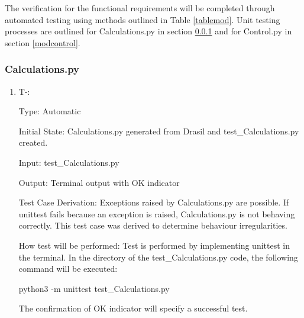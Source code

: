 \documentclass[12pt, titlepage]{article}
\newcounter{tinnum} %
\begin{document}
The verification for the functional requirements will be completed through 
automated testing using methods outlined in Table \ref{tablemod}. Unit testing 
processes are outlined for Calculations.py in section \ref{modcalc} and for 
Control.py in section \ref{modcontrol}.

\subsubsection{Calculations.py}\label{modcalc}

\begin{enumerate}

\item{T-}\thetinnum\label{T-15}:

Type: Automatic
					
Initial State: Calculations.py generated from Drasil and test\_Calculations.py 
created.
					
Input: test\_Calculations.py 
					
Output: Terminal output with OK indicator

Test Case Derivation: Exceptions raised by Calculations.py are possible. If unittest fails because an exception is raised, Calculations.py is not behaving correctly. This test case was derived to determine behaviour irregularities.

How test will be performed: Test is performed by implementing unittest in the 
terminal. In the directory of the test\_Calculations.py code, the following 
command will be executed: 
\begin{center}
python3 -m unittest test\_Calculations.py
\end{center}

The confirmation of OK indicator will specify a successful test.
					
    
\end{enumerate}
\end{document}
